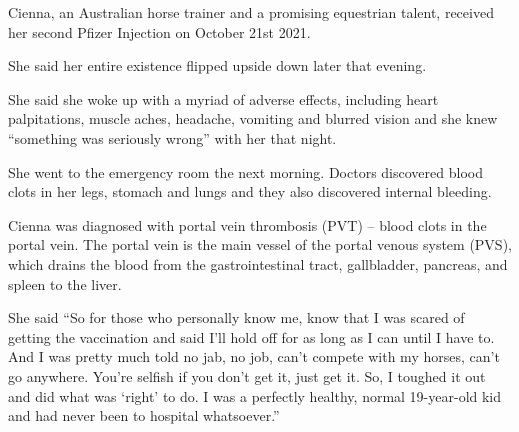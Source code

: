 Cienna, an Australian horse trainer and a promising equestrian talent, received
her second Pfizer Injection on October 21st 2021.

She said her entire existence flipped upside down later that evening.

She said she woke up with a myriad of adverse effects, including heart
palpitations, muscle aches, headache, vomiting and blurred vision and she knew
“something was seriously wrong” with her that night.

She went to the emergency room the next morning. Doctors discovered blood clots
in her legs, stomach and lungs and they also discovered internal bleeding.

Cienna was diagnosed with portal vein thrombosis (PVT) – blood clots in the
portal vein. The portal vein is the main vessel of the portal venous system
(PVS), which drains the blood from the gastrointestinal tract, gallbladder,
pancreas, and spleen to the liver.

She said “So for those who personally know me, know that I was scared of getting
the vaccination and said I’ll hold off for as long as I can until I have to. And
I was pretty much told no jab, no job, can’t compete with my horses, can’t go
anywhere. You’re selfish if you don’t get it, just get it. So, I toughed it out
and did what was ‘right’ to do. I was a perfectly healthy, normal 19-year-old
kid and had never been to hospital whatsoever.”
